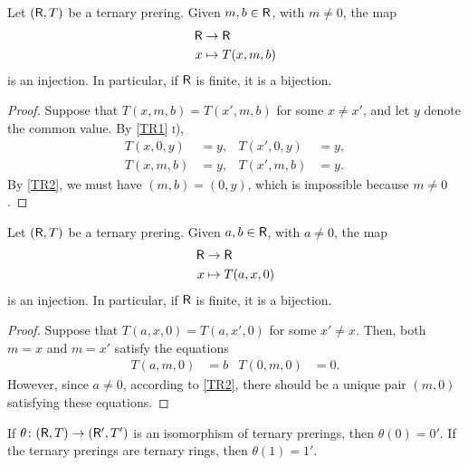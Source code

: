 \begin{lem}\label{lem:left-solution-of-sum}
    Let\/ $(\mathsf R,T)$ be a ternary prering. Given\/ $m,b\in\mathsf R$, with\/ $m\ne0$, the map
    \begin{align*}
        \mathsf R&\to\mathsf R\\
        x&\mapsto T(x,m,b)
    \end{align*}
    is an injection. In particular, if\/ $\mathsf R$ is finite, it is a bijection.
\end{lem}

\begin{proof}
    Suppose that $T(x,m,b)=T(x',m,b)$ for some $x\ne x'$, and let $y$ denote the common value. By \ref{TR1} \textsc i),
    \begin{align*}
        T(x,0,y) &= y, &T(x',0,y) &= y,\\
        T(x,m,b) &= y, &T(x',m,b) &= y.
    \end{align*}
    By \ref{TR2}, we must have $(m,b)=(0,y)$, which is impossible because $m\ne0$.
\end{proof}

\begin{lem}\label{lem:right-solution-of-product}
    Let\/ $(\mathsf R,T)$ be a ternary prering. Given $a,b\in\mathsf R$, with $a\ne0$, the map
    \begin{align*}
        \mathsf R&\to\mathsf R\\
        x&\mapsto T(a,x,0)
    \end{align*}
    is an injection. In particular, if\/ $\mathsf R$ is finite, it is a bijection.
\end{lem}

\begin{proof}
    Suppose that $T(a,x,0)=T(a,x',0)$ for some $x'\ne x$. Then, both $m=x$ and $m=x'$ satisfy the equations
    \begin{align*}
        T(a,m,0)&=b &T(0,m,0)&=0.
    \end{align*}
    However, since $a\ne0$, according to \ref{TR2}, there should be a unique pair $(m,0)$ satisfying these equations.
\end{proof}

\begin{lem}\label{lem:ternary-isomorphisms-preserve-units}
    If\/ $\theta\colon(\mathsf R,T)\to(\mathsf R',T')$ is an isomorphism of ternary prerings, then\/ $\theta(0)=0'$. If the ternary prerings are ternary rings, then\/ $\theta(1)=1'$.
\end{lem}


